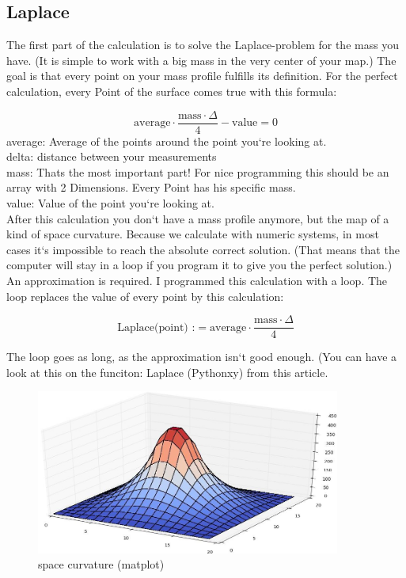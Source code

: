 \documentclass[pdftex,12pt,a4paper]{article}
\begin{document}
\subsection{Laplace}

The first part of the calculation is to solve the Laplace-problem for the mass you have. (It is simple to work with a big mass in the very center of your map.) The goal is that every point on your mass profile fulfills its definition. For the perfect calculation, every Point of the surface comes true with this formula:


\[                                                            
	\text{average}\cdot\frac{\text{mass}\cdot\Delta}{4}- \text{value}= 0
\]
average: Average of the points around the point you`re looking at.
\\[0mm]
delta: distance between your measurements
\\[0mm]
mass: Thats the most important part! For nice programming this should be an array with 2 Dimensions. Every Point has his specific mass.
\\[0mm]
value: Value of the point you`re looking at.
\\[3mm]
After this calculation you don`t have a mass profile anymore, but the map of a kind of space curvature. Because we calculate with numeric systems, in most cases it`s impossible to reach the absolute correct solution. (That means that the computer will stay in a loop if you program it to give you the perfect solution.) An approximation is required. I programmed this calculation with a loop. The loop replaces the value of every point by this calculation:

\[                                                            
	\text{Laplace(point) :}= \text{average}\cdot\frac{\text{mass}\cdot\Delta}{4}
\]

The loop goes as long, as the approximation isn`t good enough. (You can have a look at this on the funciton: Laplace (Pythonxy) from this article.

\begin{figure}[position=h]
\centering
 \caption{space curvature (matplot)}
 \includegraphics[width=10cm]{Bilder/Laplace}%
\end{figure}
\end{document}
